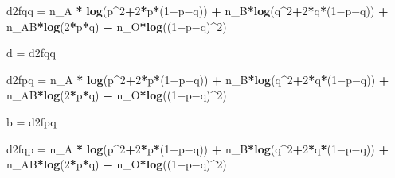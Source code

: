 \documentclass[]{article}
\newenvironment{Shaded}{\begin{snugshade}}{\end{snugshade}}
\newcommand{\KeywordTok}[1]{\textcolor[rgb]{0.13,0.29,0.53}{\textbf{#1}}}
\newcommand{\DecValTok}[1]{\textcolor[rgb]{0.00,0.00,0.81}{#1}}
\newcommand{\StringTok}[1]{\textcolor[rgb]{0.31,0.60,0.02}{#1}}
\newcommand{\OperatorTok}[1]{\textcolor[rgb]{0.81,0.36,0.00}{\textbf{#1}}}
\newcommand{\NormalTok}[1]{#1}
\begin{document}
\begin{Shaded}
\begin{Highlighting}[]
\NormalTok{    d2fqq =}\StringTok{ }\NormalTok{n_A }\OperatorTok{*}\StringTok{ }\KeywordTok{log}\NormalTok{(p}\OperatorTok{^}\DecValTok{2}\OperatorTok{+}\DecValTok{2}\OperatorTok{*}\NormalTok{p}\OperatorTok{*}\NormalTok{(}\DecValTok{1}\NormalTok{−p−q)) }\OperatorTok{+}\StringTok{ }\NormalTok{n_B}\OperatorTok{*}\KeywordTok{log}\NormalTok{(q}\OperatorTok{^}\DecValTok{2}\OperatorTok{+}\DecValTok{2}\OperatorTok{*}\NormalTok{q}\OperatorTok{*}\NormalTok{(}\DecValTok{1}\NormalTok{−p−q)) }\OperatorTok{+}\StringTok{ }\NormalTok{n_AB}\OperatorTok{*}\KeywordTok{log}\NormalTok{(}\DecValTok{2}\OperatorTok{*}\NormalTok{p}\OperatorTok{*}\NormalTok{q) }\OperatorTok{+}\StringTok{ }\NormalTok{n_O}\OperatorTok{*}\KeywordTok{log}\NormalTok{((}\DecValTok{1}\NormalTok{−p−q)}\OperatorTok{^}\DecValTok{2}\NormalTok{)}
    
    
    
    
\NormalTok{     d =}\StringTok{ }\NormalTok{d2fqq}
    
    
    
    
    
\NormalTok{    d2fpq =}\StringTok{ }\NormalTok{n_A }\OperatorTok{*}\StringTok{ }\KeywordTok{log}\NormalTok{(p}\OperatorTok{^}\DecValTok{2}\OperatorTok{+}\DecValTok{2}\OperatorTok{*}\NormalTok{p}\OperatorTok{*}\NormalTok{(}\DecValTok{1}\NormalTok{−p−q)) }\OperatorTok{+}\StringTok{ }\NormalTok{n_B}\OperatorTok{*}\KeywordTok{log}\NormalTok{(q}\OperatorTok{^}\DecValTok{2}\OperatorTok{+}\DecValTok{2}\OperatorTok{*}\NormalTok{q}\OperatorTok{*}\NormalTok{(}\DecValTok{1}\NormalTok{−p−q)) }\OperatorTok{+}\StringTok{ }\NormalTok{n_AB}\OperatorTok{*}\KeywordTok{log}\NormalTok{(}\DecValTok{2}\OperatorTok{*}\NormalTok{p}\OperatorTok{*}\NormalTok{q) }\OperatorTok{+}\StringTok{ }\NormalTok{n_O}\OperatorTok{*}\KeywordTok{log}\NormalTok{((}\DecValTok{1}\NormalTok{−p−q)}\OperatorTok{^}\DecValTok{2}\NormalTok{) }
    
    
    
    
\NormalTok{     b =}\StringTok{ }\NormalTok{d2fpq}
    
    
    
    
    
\NormalTok{    d2fqp =}\StringTok{ }\NormalTok{n_A }\OperatorTok{*}\StringTok{ }\KeywordTok{log}\NormalTok{(p}\OperatorTok{^}\DecValTok{2}\OperatorTok{+}\DecValTok{2}\OperatorTok{*}\NormalTok{p}\OperatorTok{*}\NormalTok{(}\DecValTok{1}\NormalTok{−p−q)) }\OperatorTok{+}\StringTok{ }\NormalTok{n_B}\OperatorTok{*}\KeywordTok{log}\NormalTok{(q}\OperatorTok{^}\DecValTok{2}\OperatorTok{+}\DecValTok{2}\OperatorTok{*}\NormalTok{q}\OperatorTok{*}\NormalTok{(}\DecValTok{1}\NormalTok{−p−q)) }\OperatorTok{+}\StringTok{ }\NormalTok{n_AB}\OperatorTok{*}\KeywordTok{log}\NormalTok{(}\DecValTok{2}\OperatorTok{*}\NormalTok{p}\OperatorTok{*}\NormalTok{q) }\OperatorTok{+}\StringTok{ }\NormalTok{n_O}\OperatorTok{*}\KeywordTok{log}\NormalTok{((}\DecValTok{1}\NormalTok{−p−q)}\OperatorTok{^}\DecValTok{2}\NormalTok{) }
    

\end{Highlighting}
\end{Shaded}
\end{document}
